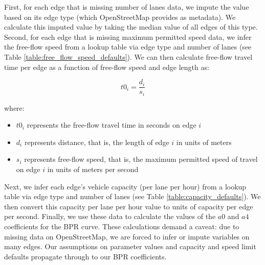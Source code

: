 First, for each edge that is missing number of lanes data, we impute the value based on its edge type (which OpenStreetMap provides as metadata). We calculate this imputed value by taking the median value of all edges of this type. Second, for each edge that is missing maximum permitted speed data, we infer the free-flow speed from a lookup table via edge type and number of lanes (see Table \ref{table:free_flow_speed_defaults}). We can then calculate free-flow travel time per edge as a function of free-flow speed and edge length as:

\bigskip
\begin{equation}
    t0_i = \frac{d_i}{s_i}
    \label{eq:free_flow_travel_time}
\end{equation}

\bigskip
where:

\bigskip
\begin{itemize}
    \item $t0_i$ represents the free-flow travel time in seconds on edge $i$
    \item $d_i$ represents distance, that is, the length of edge $i$ in units of meters
    \item $s_i$ represents free-flow speed, that is, the maximum permitted speed of travel on edge $i$ in units of meters per second
\end{itemize}

\bigskip
Next, we infer each edge's vehicle capacity (per lane per hour) from a lookup table via edge type and number of lanes (see Table \ref{table:capacity_defaults}). We then convert this capacity per lane per hour value to units of capacity per edge per second. Finally, we use these data to calculate the values of the $a0$ and $a4$ coefficients for the BPR curve. These calculations demand a caveat: due to missing data on OpenStreetMap, we are forced to infer or impute variables on many edges. Our assumptions on parameter values and capacity and speed limit defaults propagate through to our BPR coefficients.

